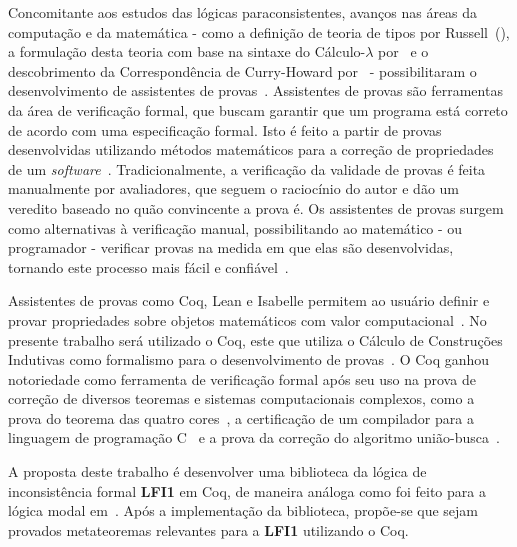 Concomitante aos estudos das lógicas paraconsistentes, avanços nas áreas da computação e da matemática {-} como a definição de teoria de tipos por Russell~(\citeyear{russell1903principles,Russell1908-RUSMLA}), a formulação desta teoria com base na sintaxe do Cálculo-$\lambda$ por~ e o descobrimento da Correspondência de Curry-Howard por~  {-} possibilitaram o desenvolvimento de assistentes de provas~\cite{harrison2014history}. Assistentes de provas são ferramentas da área de verificação formal, que buscam garantir que um programa está correto de acordo com uma especificação formal. Isto é feito a partir de provas desenvolvidas utilizando métodos matemáticos para a correção de propriedades de um \textit{software}~\cite{Chlipala_2013}. Tradicionalmente, a verificação da validade de provas é feita manualmente por avaliadores, que seguem o raciocínio do autor e dão um veredito baseado no quão convincente a prova é. Os assistentes de provas surgem como alternativas à verificação manual, possibilitando ao matemático {-} ou programador {-} verificar provas na medida em que elas são desenvolvidas, tornando este processo mais fácil e confiável~\cite{paulinmohring:hal-01094195}.

Assistentes de provas como Coq, Lean e Isabelle permitem ao usuário definir e provar propriedades sobre objetos matemáticos com valor computacional~\cite{geuvers2009proof}. No presente trabalho será utilizado o Coq, este que utiliza o Cálculo de Construções Indutivas como formalismo para o desenvolvimento de provas~\cite{TEAM_2024}. O Coq ganhou notoriedade como ferramenta de verificação formal após seu uso na prova de correção de diversos teoremas e sistemas computacionais complexos, como a prova do teorema das quatro cores~\cite{geuvers2009proof}, a certificação de um compilador para a linguagem de programação C~\cite{leroy2021compcert} e a prova da correção do algoritmo união-busca~\cite{union-find}.

A proposta deste trabalho é desenvolver uma biblioteca da lógica de inconsistência formal \textbf{LFI1} em Coq, de maneira análoga como foi feito para a lógica modal em~. Após a implementação da biblioteca, propõe-se que sejam provados metateoremas relevantes para a \textbf{LFI1} utilizando o Coq.




